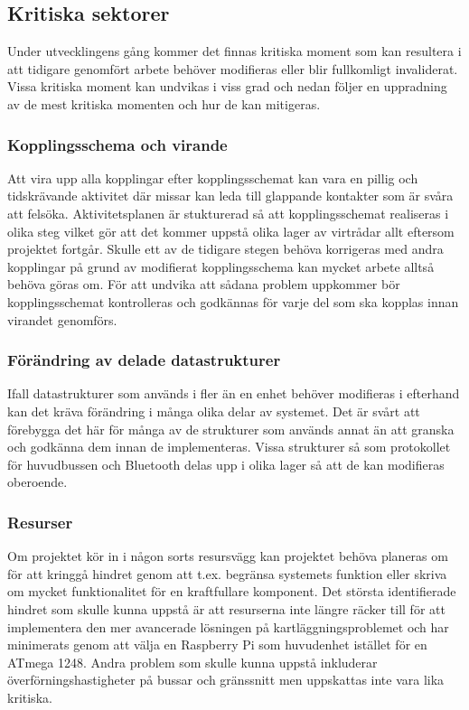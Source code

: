 \documentclass{article}
\begin{document}
\subsection{Kritiska sektorer}
Under utvecklingens gång kommer det finnas kritiska moment som kan resultera i att tidigare genomfört arbete behöver modifieras eller blir fullkomligt invaliderat. Vissa kritiska moment kan undvikas i viss grad och nedan följer en uppradning av de mest kritiska momenten och hur de kan mitigeras.

\subsubsection{Kopplingsschema och virande}
Att vira upp alla kopplingar efter kopplingsschemat kan vara en pillig och tidskrävande aktivitet där missar kan leda till glappande kontakter som är svåra att felsöka. Aktivitetsplanen är stukturerad så att kopplingsschemat realiseras i olika steg vilket gör att det kommer uppstå olika lager av virtrådar allt eftersom projektet fortgår. Skulle ett av de tidigare stegen behöva korrigeras med andra kopplingar på grund av modifierat kopplingsschema kan mycket arbete alltså behöva göras om. För att undvika att sådana problem uppkommer bör kopplingsschemat kontrolleras och godkännas för varje del som ska kopplas innan virandet genomförs.

\subsubsection{Förändring av delade datastrukturer}
Ifall datastrukturer som används i fler än en enhet behöver modifieras i efterhand kan det kräva förändring i många olika delar av systemet. Det är svårt att förebygga det här för många av de strukturer som används annat än att granska och godkänna dem innan de implementeras. Vissa strukturer så som protokollet för huvudbussen och Bluetooth delas upp i olika lager så att de kan modifieras oberoende.

\subsubsection{Resurser}
Om projektet kör in i någon sorts resursvägg kan projektet behöva planeras om för att kringgå hindret genom att t.ex. begränsa systemets funktion eller skriva om mycket funktionalitet för en kraftfullare komponent. Det största identifierade hindret som skulle kunna uppstå är att resurserna inte längre räcker till för att implementera den mer avancerade lösningen på kartläggningsproblemet och har minimerats genom att välja en Raspberry Pi som huvudenhet istället för en ATmega 1248. Andra problem som skulle kunna uppstå inkluderar överförningshastigheter på bussar och gränssnitt men uppskattas inte vara lika kritiska. 
\end{document}
